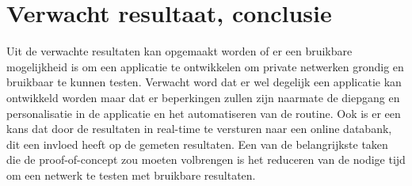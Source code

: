 \section{Verwacht resultaat, conclusie}%
\label{sec:verwachte_resultaten}

Uit de verwachte resultaten kan opgemaakt worden of er een bruikbare mogelijkheid is om een applicatie te ontwikkelen om private netwerken grondig en bruikbaar te kunnen testen. Verwacht word dat er wel degelijk een applicatie kan ontwikkeld worden maar dat er beperkingen zullen zijn naarmate de diepgang en personalisatie in de applicatie en het automatiseren van de routine. Ook is er een kans dat door de resultaten in real-time te versturen naar een online databank, dit een invloed heeft op de gemeten resultaten. Een van de belangrijkste taken die de proof-of-concept zou moeten volbrengen is het reduceren van de nodige tijd om een netwerk te testen met bruikbare resultaten. 
